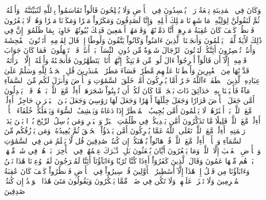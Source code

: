 وَكَانَ فِي ٱلۡمَدِينَةِ تِسۡعَةُ رَهۡطٖ يُفۡسِدُونَ فِي ٱلۡأَرۡضِ وَلَا يُصۡلِحُونَ
قَالُواْ تَقَاسَمُواْ بِٱللَّهِ لَنُبَيِّتَنَّهُۥ وَأَهۡلَهُۥ ثُمَّ لَنَقُولَنَّ لِوَلِيِّهِۦ مَا شَهِدۡنَا مَهۡلِكَ أَهۡلِهِۦ وَإِنَّا لَصَٰدِقُونَ
وَمَكَرُواْ مَكۡرٗا وَمَكَرۡنَا مَكۡرٗا وَهُمۡ لَا يَشۡعُرُونَ
فَٱنظُرۡ كَيۡفَ كَانَ عَٰقِبَةُ مَكۡرِهِمۡ أَنَّا دَمَّرۡنَٰهُمۡ وَقَوۡمَهُمۡ أَجۡمَعِينَ
فَتِلۡكَ بُيُوتُهُمۡ خَاوِيَةَۢ بِمَا ظَلَمُوٓاْۚ إِنَّ فِي ذَٰلِكَ لَأٓيَةٗ لِّقَوۡمٖ يَعۡلَمُونَ
وَأَنجَيۡنَا ٱلَّذِينَ ءَامَنُواْ وَكَانُواْ يَتَّقُونَ
وَلُوطًا إِذۡ قَالَ لِقَوۡمِهِۦٓ أَتَأۡتُونَ ٱلۡفَٰحِشَةَ وَأَنتُمۡ تُبۡصِرُونَ
أَئِنَّكُمۡ لَتَأۡتُونَ ٱلرِّجَالَ شَهۡوَةٗ مِّن دُونِ ٱلنِّسَآءِۚ بَلۡ أَنتُمۡ قَوۡمٞ تَجۡهَلُونَ
۞فَمَا كَانَ جَوَابَ قَوۡمِهِۦٓ إِلَّآ أَن قَالُوٓاْ أَخۡرِجُوٓاْ ءَالَ لُوطٖ مِّن قَرۡيَتِكُمۡۖ إِنَّهُمۡ أُنَاسٞ يَتَطَهَّرُونَ
فَأَنجَيۡنَٰهُ وَأَهۡلَهُۥٓ إِلَّا ٱمۡرَأَتَهُۥ قَدَّرۡنَٰهَا مِنَ ٱلۡغَٰبِرِينَ
وَأَمۡطَرۡنَا عَلَيۡهِم مَّطَرٗاۖ فَسَآءَ مَطَرُ ٱلۡمُنذَرِينَ
قُلِ ٱلۡحَمۡدُ لِلَّهِ وَسَلَٰمٌ عَلَىٰ عِبَادِهِ ٱلَّذِينَ ٱصۡطَفَىٰٓۗ ءَآللَّهُ خَيۡرٌ أَمَّا يُشۡرِكُونَ
أَمَّنۡ خَلَقَ ٱلسَّمَٰوَٰتِ وَٱلۡأَرۡضَ وَأَنزَلَ لَكُم مِّنَ ٱلسَّمَآءِ مَآءٗ فَأَنۢبَتۡنَا بِهِۦ حَدَآئِقَ ذَاتَ بَهۡجَةٖ مَّا كَانَ لَكُمۡ أَن تُنۢبِتُواْ شَجَرَهَآۗ أَءِلَٰهٞ مَّعَ ٱللَّهِۚ بَلۡ هُمۡ قَوۡمٞ يَعۡدِلُونَ
أَمَّن جَعَلَ ٱلۡأَرۡضَ قَرَارٗا وَجَعَلَ خِلَٰلَهَآ أَنۡهَٰرٗا وَجَعَلَ لَهَا رَوَٰسِيَ وَجَعَلَ بَيۡنَ ٱلۡبَحۡرَيۡنِ حَاجِزًاۗ أَءِلَٰهٞ مَّعَ ٱللَّهِۚ بَلۡ أَكۡثَرُهُمۡ لَا يَعۡلَمُونَ
أَمَّن يُجِيبُ ٱلۡمُضۡطَرَّ إِذَا دَعَاهُ وَيَكۡشِفُ ٱلسُّوٓءَ وَيَجۡعَلُكُمۡ خُلَفَآءَ ٱلۡأَرۡضِۗ أَءِلَٰهٞ مَّعَ ٱللَّهِۚ قَلِيلٗا مَّا تَذَكَّرُونَ
أَمَّن يَهۡدِيكُمۡ فِي ظُلُمَٰتِ ٱلۡبَرِّ وَٱلۡبَحۡرِ وَمَن يُرۡسِلُ ٱلرِّيَٰحَ بُشۡرَۢا بَيۡنَ يَدَيۡ رَحۡمَتِهِۦٓۗ أَءِلَٰهٞ مَّعَ ٱللَّهِۚ تَعَٰلَى ٱللَّهُ عَمَّا يُشۡرِكُونَ
أَمَّن يَبۡدَؤُاْ ٱلۡخَلۡقَ ثُمَّ يُعِيدُهُۥ وَمَن يَرۡزُقُكُم مِّنَ ٱلسَّمَآءِ وَٱلۡأَرۡضِۗ أَءِلَٰهٞ مَّعَ ٱللَّهِۚ قُلۡ هَاتُواْ بُرۡهَٰنَكُمۡ إِن كُنتُمۡ صَٰدِقِينَ
قُل لَّا يَعۡلَمُ مَن فِي ٱلسَّمَٰوَٰتِ وَٱلۡأَرۡضِ ٱلۡغَيۡبَ إِلَّا ٱللَّهُۚ وَمَا يَشۡعُرُونَ أَيَّانَ يُبۡعَثُونَ
بَلِ ٱدَّـٰرَكَ عِلۡمُهُمۡ فِي ٱلۡأٓخِرَةِۚ بَلۡ هُمۡ فِي شَكّٖ مِّنۡهَاۖ بَلۡ هُم مِّنۡهَا عَمُونَ
وَقَالَ ٱلَّذِينَ كَفَرُوٓاْ أَءِذَا كُنَّا تُرَٰبٗا وَءَابَآؤُنَآ أَئِنَّا لَمُخۡرَجُونَ
لَقَدۡ وُعِدۡنَا هَٰذَا نَحۡنُ وَءَابَآؤُنَا مِن قَبۡلُ إِنۡ هَٰذَآ إِلَّآ أَسَٰطِيرُ ٱلۡأَوَّلِينَ
قُلۡ سِيرُواْ فِي ٱلۡأَرۡضِ فَٱنظُرُواْ كَيۡفَ كَانَ عَٰقِبَةُ ٱلۡمُجۡرِمِينَ
وَلَا تَحۡزَنۡ عَلَيۡهِمۡ وَلَا تَكُن فِي ضَيۡقٖ مِّمَّا يَمۡكُرُونَ
وَيَقُولُونَ مَتَىٰ هَٰذَا ٱلۡوَعۡدُ إِن كُنتُمۡ صَٰدِقِينَ
